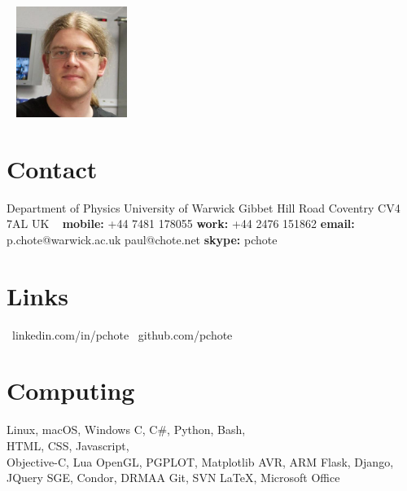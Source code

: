 \documentclass[print]{cv-style}
\begin{document}

\begin{aside}
\vspace{0.35cm}~
\includegraphics[width=3.6cm]{CV_Photo.jpg}
~
\section{Contact}
Department of Physics
University of Warwick
Gibbet Hill Road
Coventry
CV4 7AL
UK
~
{\bf mobile:} 
+44 7481 178055
{\bf work:} 
+44 2476 151862
{\bf email:}
{\small p.chote@warwick.ac.uk}
{\small paul@chote.net}
{\bf skype:}
{\small pchote}
~
\section{Links}
{\small \faLinkedin~linkedin.com/in/pchote}
{\small \faGithub~github.com/pchote}
~
\section{Computing}
\vspace{1mm}{\bf Operating systems:} 
{\small Linux, macOS, Windows}
\vspace{1mm}{\bf Programming Languages:} 
{\small C, C\#, Python, Bash,\\HTML, CSS, Javascript,\\Objective-C, Lua}
\vspace{1mm}{\bf Display APIs:} 
{\small OpenGL, PGPLOT, Matplotlib}
\vspace{1mm}{\bf Embedded Systems:}
{\small AVR, ARM}
\vspace{1mm}{\bf Web Frameworks:}
{\small Flask, Django, JQuery}
\vspace{1mm}{\bf Grid Computing:} 
{\small SGE, Condor, DRMAA}
\vspace{1mm}{\bf Version Control:} 
{\small Git, SVN}
\vspace{1mm}{\bf Word Processing:} 
{\small \LaTeX, Microsoft Office}
~
\end{aside}

\vspace{0.5cm}
\end{document}
